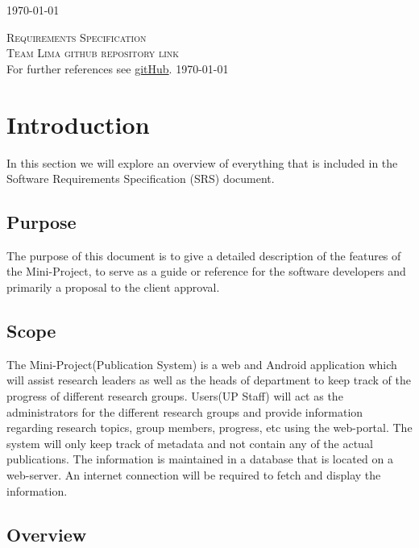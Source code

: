 \documentclass[a4paper,12pt]{report}
\begin{document}
\begin{titlepage}
\begin{center}
{\large \today}
\end{center}
\end{titlepage}
\footnotesize
\normalsize

\renewcommand{\thesection}{\arabic{section}}
\newpage
\begin{center}
\textsc{\LARGE Requirements Specification}\\[1.5cm]
\textsc{\Large Team Lima github repository link}\\[0.5cm]
For further references see \href{https://https://github.com/slugger7/team-lima}{gitHub}.
\today
\end{center}


\newpage
\section{Introduction}
In this section we will explore an overview of everything that is included in the Software Requirements Specification (SRS) document.

\subsection{Purpose}
The purpose of this document is to give a detailed description of the features of the Mini-Project, to serve as a guide or reference for the software developers and primarily a proposal to the client approval.

\subsection{Scope}
The Mini-Project(Publication System) is a web and Android application which will assist research leaders as well as the heads of department to keep track of the progress of different research groups.
\newline Users(UP Staff) will act as the administrators for the different research groups and provide information regarding research topics, group members, progress, etc using the web-portal.
\newline The system will only keep track of metadata and not contain any of the actual publications. The information is maintained in a database that is located on a web-server. An internet connection will be required to fetch and display the information.

\subsection{Overview}
\end{document}
